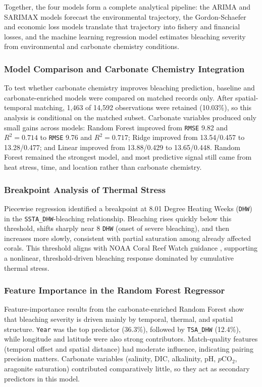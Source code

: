 \documentclass[10pt,letterpaper]{article}
\begin{document}
Together, the four models form a complete analytical pipeline: the ARIMA and SARIMAX models forecast the environmental trajectory, the Gordon-Schaefer and economic loss models translate that trajectory into fishery and financial losses, and the machine learning regression model estimates bleaching severity from environmental and carbonate chemistry conditions.


\subsubsection{Model Comparison and Carbonate Chemistry Integration}

To test whether carbonate chemistry improves bleaching prediction, baseline and carbonate-enriched models were compared on matched records only. After spatial-temporal matching, 1,463 of 14,592 observations were retained (10.03\%), so this analysis is conditional on the matched subset. Carbonate variables produced only small gains across models: Random Forest improved from \texttt{RMSE} 9.82 and $R^2=0.714$ to \texttt{RMSE} 9.76 and $R^2=0.717$; Ridge improved from 13.54/0.457 to 13.28/0.477; and Linear improved from 13.88/0.429 to 13.65/0.448. Random Forest remained the strongest model, and most predictive signal still came from heat stress, time, and location rather than carbonate chemistry.

\subsubsection{Breakpoint Analysis of Thermal Stress}

Piecewise regression identified a breakpoint at 8.01 Degree Heating Weeks (\texttt{DHW}) in the \texttt{SSTA\_DHW}-bleaching relationship. Bleaching rises quickly below this threshold, shifts sharply near 8 \texttt{DHW} (onset of severe bleaching), and then increases more slowly, consistent with partial saturation among already affected corals. This threshold aligns with NOAA Coral Reef Watch guidance \cite{noaa_crw}, supporting a nonlinear, threshold-driven bleaching response dominated by cumulative thermal stress.

\subsubsection{Feature Importance in the Random Forest Regressor}

Feature-importance results from the carbonate-enriched Random Forest show that bleaching severity is driven mainly by temporal, thermal, and spatial structure. \texttt{Year} was the top predictor (36.3\%), followed by \texttt{TSA\_DHW} (12.4\%), while longitude and latitude were also strong contributors. Match-quality features (temporal offset and spatial distance) had moderate influence, indicating pairing precision matters. Carbonate variables (salinity, DIC, alkalinity, pH, $p\mathrm{CO}_2$, aragonite saturation) contributed comparatively little, so they act as secondary predictors in this model.
\end{document}
